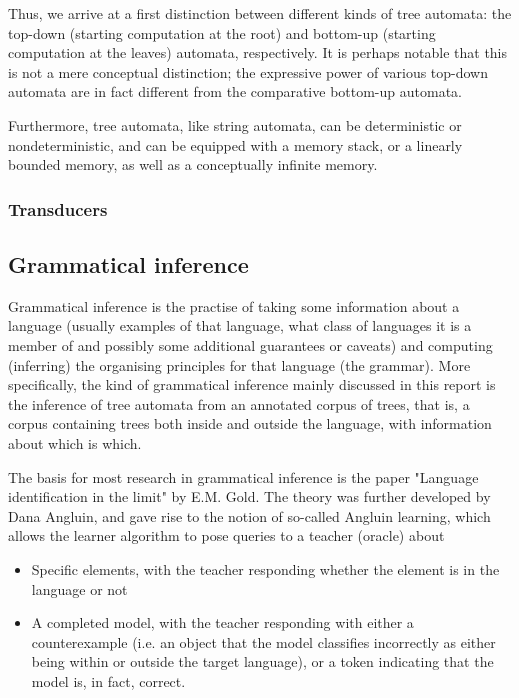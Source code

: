Thus, we arrive at a first distinction between different kinds of tree
automata: the top-down (starting computation at the root) and bottom-up
(starting computation at the leaves) automata, respectively. It is perhaps
notable that this is not a mere conceptual distinction; the expressive
power of various top-down automata are in fact different from the
comparative bottom-up automata.

Furthermore, tree automata, like string automata, can be deterministic or
nondeterministic, and can be equipped with a memory stack, or a linearly
bounded memory, as well as a conceptually infinite memory.

\subsubsection{Transducers}




\subsection{Grammatical inference}

Grammatical inference is the practise of taking some information about a
language (usually examples of that language, what class of languages it is
a member of and possibly some additional guarantees or caveats) and
computing (inferring) the organising principles for that language (the
grammar). More specifically, the kind of grammatical inference mainly
discussed in this report is the inference of tree automata from an
annotated corpus of trees, that is, a corpus containing trees both inside
and outside the language, with information about which is which. 

The basis for most research in grammatical inference is the paper "Language
identification in the limit" by E.M. Gold. The theory was further developed
by Dana Angluin, and gave rise to the notion of so-called Angluin learning,
which allows the learner algorithm to pose queries to a teacher (oracle)
about
\begin{itemize}
\item Specific elements, with the teacher responding whether the element is
in the language or not
\item A completed model, with the teacher responding with either a
counterexample (i.e. an object that the model classifies incorrectly as
either being within or outside the target language), or a token indicating
that the model is, in fact, correct.
\end{itemize}


